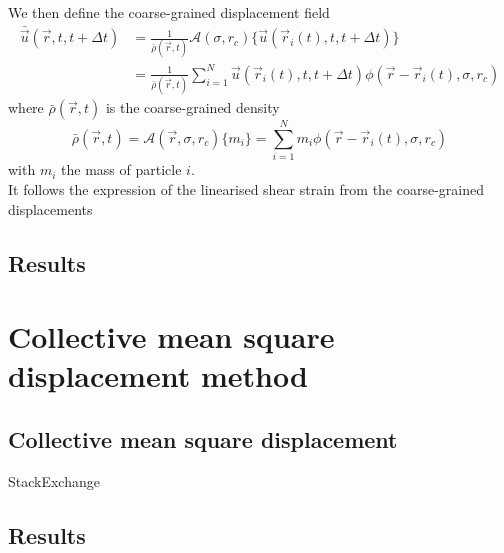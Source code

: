 \documentclass[class=report, float=false, crop=false]{standalone}
\begin{document}
We then define the coarse-grained displacement field \cite{illing2016strain}
\begin{equation}
\begin{aligned}
\bar{\vec{u}}(\vec{r}, t, t+\Delta t) &= \frac{1}{\bar{\rho}(\vec{r}, t)} \mathcal{A}(\sigma, r_c)\{\vec{u}(\vec{r}_i(t), t, t+\Delta t)\} \\
&= \frac{1}{\bar{\rho}(\vec{r}, t)} \sum_{i=1}^N \vec{u}(\vec{r}_i(t), t, t+\Delta t) \phi(\vec{r}-\vec{r}_i(t), \sigma, r_c)
\end{aligned}
\end{equation}
where $\bar{\rho}(\vec{r}, t)$ is the coarse-grained density
\begin{equation}
\bar{\rho}(\vec{r}, t) = \mathcal{A}(\vec{r}, \sigma, r_c)\{m_i\} = \sum_{i=1}^N m_i \phi(\vec{r}-\vec{r}_i(t), \sigma, r_c)
\end{equation}
with $m_i$ the mass of particle $i$.\\

It follows the expression of the linearised shear strain from the coarse-grained displacements

\subsection{Results}

\section{Collective mean square displacement method}

\subsection{Collective mean square displacement}

StackExchange \faStackExchange~ \cite{stackexchange}

\subsection{Results}
\end{document}
